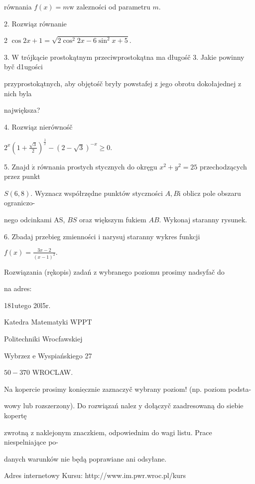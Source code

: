 \documentclass[a4paper,12pt]{article}
\begin{document}
równania $f(x)=m\mathrm{w}$ zalezności od parametru $m.$

2. Rozwiąz równanie

2 $\cos 2x+1=\sqrt{2\cos^{2}2x-6\sin^{2}x+5}.$

3. $\mathrm{W}$ trójkącie prostokątnym przeciwprostokątna ma długośč 3. Jakie powinny byč d1ugości

przyprostokątnych, aby objętośč bryły powstafej $\mathrm{z}$ jego obrotu dokołajednej $\mathrm{z}$ nich byla

największa?

4. Rozwiąz nierównośč

$2^{x}(1+\displaystyle \frac{\sqrt{3}}{2})^{\frac{1}{x}}-(2-\sqrt{3})^{-x}\geq 0.$

5. Znajd $\acute{\mathrm{z}}$ równania prostych stycznych do okręgu $x^{2}+y^{2}=25$ przechodzących przez punkt

$S(6,8)$. Wyznacz współrzędne punktów styczności $A, B\mathrm{i}$ oblicz pole obszaru ograniczo-

nego odcinkami AS, $BS$ oraz większym fukiem $AB$. Wykonaj staranny rysunek.

6. Zbadaj przebieg zmienności $\mathrm{i}$ narysuj staranny wykres funkcji

$f(x)=\displaystyle \frac{3x-2}{(x-1)^{2}}.$

Rozwiązania (rękopis) zadań z wybranego poziomu prosimy nadsyfač do

na adres:

181utego 20l5r.

Katedra Matematyki WPPT

Politechniki Wrocfawskiej

Wybrzez $\mathrm{e}$ Wyspiańskiego 27

$50-370$ WROCLAW.

Na kopercie prosimy $\underline{\mathrm{k}\mathrm{o}\mathrm{n}\mathrm{i}\mathrm{e}\mathrm{c}\mathrm{z}\mathrm{n}\mathrm{i}\mathrm{e}}$ zaznaczyč wybrany poziom! (np. poziom podsta-

wowy $\mathrm{l}\mathrm{u}\mathrm{b}$ rozszerzony). Do rozwiązań nalez $\mathrm{y}$ dołączyč zaadresowaną do siebie kopertę

zwrotną $\mathrm{z}$ naklejonym znaczkiem, odpowiednim do wagi listu. Prace niespelniające po-

danych warunków nie będą poprawiane ani odsyłane.

Adres internetowy Kursu: http://www.im.pwr.wroc.pl/kurs
\end{document}
